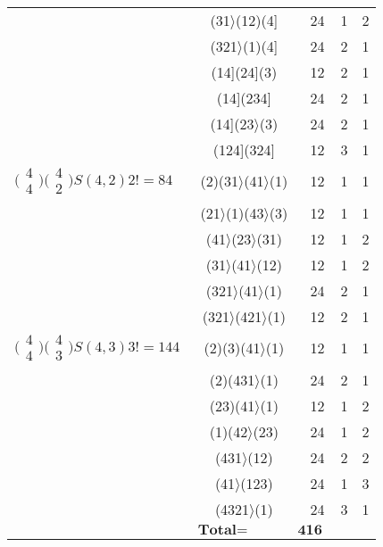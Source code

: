 \documentclass{surv-l}
\numberwithin{equation}{section}
\numberwithin{table}{section}
\numberwithin{figure}{section}
\theoremstyle{definition}
\begin{document}
\begin{table}[!h]
{\begin{tabular}{|l|c|c|c|c|}
&(31$\rangle$(12)(4] &24 &1 &2 \\
&(321$\rangle$(1)(4] &24 &2 &1 \\
&(14](24](3) &12 &2 &1 \\
&(14](234] &24 &2 &1 \\
&(14](23$\rangle$(3) &24 &2 &1 \\
&(124](324] &12 &3 &1 \\
\hline
$\big(\!\begin{smallmatrix}4\\ 4\end{smallmatrix}\!\big)\big(\!\begin{smallmatrix}4\\ 2\end{smallmatrix}\!\big)S(4,2)2!=84$ &(2)(31$\rangle$(41$\rangle$(1) &12 &1 &1 \\
&(21$\rangle$(1)(43$\rangle$(3) &12 &1 &1 \\
&(41$\rangle$(23$\rangle$(31) &12 &1 &2 \\
&(31$\rangle$(41$\rangle$(12) &12 &1 &2 \\
&(321$\rangle$(41$\rangle$(1) &24 &2 &1 \\
&(321$\rangle$(421$\rangle$(1) &12 &2 &1 \\
\hline
$\big(\!\begin{smallmatrix}4\\ 4\end{smallmatrix}\!\big)\big(\!\begin{smallmatrix}4\\ 3\end{smallmatrix}\!\big)S(4,3)3!=144$ &(2)(3)(41$\rangle$(1) &12 &1 &1 \\
&(2)(431$\rangle$(1) &24 &2 &1 \\
&(23)(41$\rangle$(1) &12 &1 &2 \\
&(1)(42$\rangle$(23) &24 &1 &2 \\
&(431$\rangle$(12) &24 &2 &2 \\
&(41$\rangle$(123) &24 &1 &3 \\
&(4321$\rangle$(1) &24 &3 &1 \\
\hline
&\multicolumn{2}{c}{$\textbf{Total} =\qquad\quad\enspace \textbf{416}$} & & \\
\hline
\end{tabular}}{}
\end{table}
\end{document}
